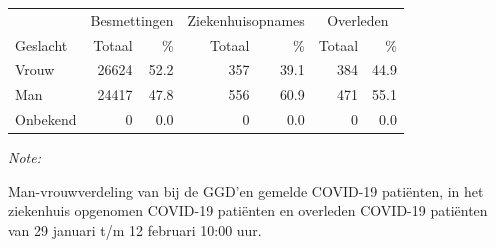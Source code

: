 \documentclass[
  english,
  man,floatsintext]{apa6}
\begin{document}
\begin{table}[H]
\centering\begingroup\fontsize{11}{13}\selectfont

\begin{threeparttable}
\begin{tabular}{lrrrrrr}
\toprule
\multicolumn{1}{c}{ } & \multicolumn{2}{c}{Besmettingen} & \multicolumn{2}{c}{Ziekenhuisopnames} & \multicolumn{2}{c}{Overleden} \\
\cmidrule(l{3pt}r{3pt}){2-3} \cmidrule(l{3pt}r{3pt}){4-5} \cmidrule(l{3pt}r{3pt}){6-7}
Geslacht & Totaal & \% & Totaal & \% & Totaal & \%\\
\midrule
Vrouw & 26624 & 52.2 & 357 & 39.1 & 384 & 44.9\\
Man & 24417 & 47.8 & 556 & 60.9 & 471 & 55.1\\
Onbekend & 0 & 0.0 & 0 & 0.0 & 0 & 0.0\\
\bottomrule
\end{tabular}
\begin{tablenotes}
\item \textit{Note: } 
\item Man-vrouwverdeling van bij de GGD’en gemelde COVID-19 patiënten, in het ziekenhuis opgenomen COVID-19 patiënten en overleden COVID-19 patiënten van 29 januari t/m 12 februari 10:00 uur.
\end{tablenotes}
\end{threeparttable}
\endgroup{}
\end{table}
\newpage
\end{document}
